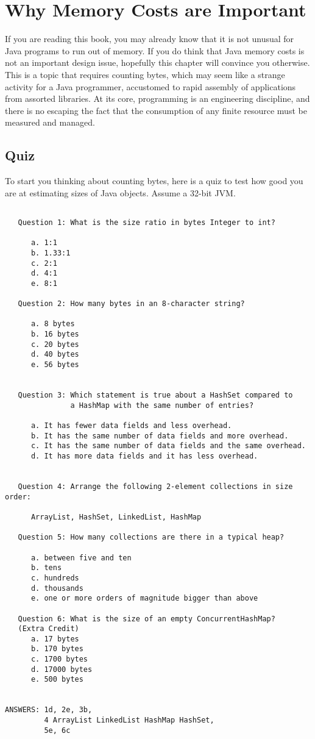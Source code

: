 \chapter{Why Memory Costs are Important}

If you are reading this book, you may already know that it is not unusual for
Java programs to run out of memory. If you do think that Java memory costs is
not an important design issue, hopefully this chapter will convince you
otherwise. This is a topic that requires counting bytes, which may seem like a
strange activity for a Java programmer, accustomed to rapid assembly of
applications from assorted libraries. At its core, programming is an engineering
discipline, and there is no escaping the fact that the consumption of any finite
resource must be measured and managed.

\section{Quiz}

To start you thinking about counting bytes, here is a quiz to test how good you
are at estimating sizes of Java objects. Assume a 32-bit JVM.
\begin{verbatim}

   Question 1: What is the size ratio in bytes Integer to int?
   
      a. 1:1
      b. 1.33:1
      c. 2:1
      d. 4:1
      e. 8:1
   
   Question 2: How many bytes in an 8-character string?

      a. 8 bytes
      b. 16 bytes
      c. 20 bytes
      d. 40 bytes
      e. 56 bytes
 
   
   Question 3: Which statement is true about a HashSet compared to 
               a HashMap with the same number of entries?
               
      a. It has fewer data fields and less overhead.
      b. It has the same number of data fields and more overhead.
      c. It has the same number of data fields and the same overhead.
      d. It has more data fields and it has less overhead.
                  
                       
   Question 4: Arrange the following 2-element collections in size order:
    
      ArrayList, HashSet, LinkedList, HashMap
          
   Question 5: How many collections are there in a typical heap?
   
      a. between five and ten
      b. tens
      c. hundreds
      d. thousands
      e. one or more orders of magnitude bigger than above

   Question 6: What is the size of an empty ConcurrentHashMap?
   (Extra Credit)
      a. 17 bytes
      b. 170 bytes
      c. 1700 bytes
      d. 17000 bytes
      e. 500 bytes
           

ANSWERS: 1d, 2e, 3b, 
         4 ArrayList LinkedList HashMap HashSet, 
         5e, 6c                 
\end{verbatim}

